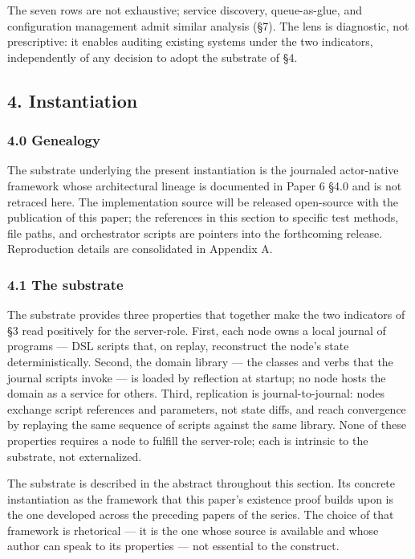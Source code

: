 \documentclass[
]{article}
\begin{document}
The seven rows are not exhaustive; service discovery, queue-as-glue, and
configuration management admit similar analysis (§7). The lens is
diagnostic, not prescriptive: it enables auditing existing systems under
the two indicators, independently of any decision to adopt the substrate
of §4.

\subsection{4. Instantiation}\label{instantiation}

\subsubsection{4.0 Genealogy}\label{genealogy}

The substrate underlying the present instantiation is the journaled
actor-native framework whose architectural lineage is documented in
Paper 6 §4.0 and is not retraced here. The implementation source will be
released open-source with the publication of this paper; the references
in this section to specific test methods, file paths, and orchestrator
scripts are pointers into the forthcoming release. Reproduction details
are consolidated in Appendix A.

\subsubsection{4.1 The substrate}\label{the-substrate}

The substrate provides three properties that together make the two
indicators of §3 read positively for the server-role. First, each node
owns a local journal of programs --- DSL scripts that, on replay,
reconstruct the node's state deterministically. Second, the domain
library --- the classes and verbs that the journal scripts invoke --- is
loaded by reflection at startup; no node hosts the domain as a service
for others. Third, replication is journal-to-journal: nodes exchange
script references and parameters, not state diffs, and reach convergence
by replaying the same sequence of scripts against the same library. None
of these properties requires a node to fulfill the server-role; each is
intrinsic to the substrate, not externalized.

The substrate is described in the abstract throughout this section. Its
concrete instantiation as the framework that this paper's existence
proof builds upon is the one developed across the preceding papers of
the series. The choice of that framework is rhetorical --- it is the one
whose source is available and whose author can speak to its properties
--- not essential to the construct.
\end{document}
